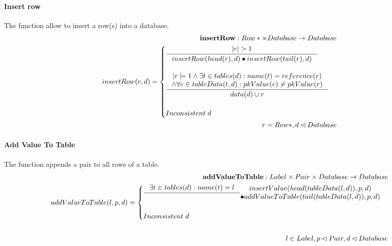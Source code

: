 \documentclass[11pt]{article}
\begin{document}
\paragraph{Insert row} The function allow to insert a row(s) into a database.
\begin{align*}
	\mathbf{insertRow} : Row* \times Database \rightarrow Database \\
	insertRow(r, d) = \begin{cases}
			\inference{|r|>1}{insertRow(head(r), d) \bullet insertRow(tail(r), d)} \\ \\
		 	\inference{|r|=1 \wedge \exists t \in tables(d) : name(t) = reference(r) \\ \wedge \forall e \in tableData(t, d) : pkValue(e) \neq pkValue(r)}{data(d) \cup r} \\ \\
			 Inconsistent \; d
		 \end{cases}	\\
		 r = Row*,d \lhd Database
\end{align*}
\paragraph{Add Value To Table} The function appends a pair to all rows of a table.
\begin{align*}
	\mathbf{addValueToTable} : Label \times Pair \times Database \rightarrow Database \\
	addValueToTable(l, p, d) = \begin{cases}
 		\inference{\exists t \in tables(d) : name(t) = l}	{\begin{gathered}
		insertValue(head(tableData(l, d)), p, d) \\ \bullet addValueToTable(tail(tableData(l, d)), p, d)
	\end{gathered}} \\ \\
 		Inconsistent \; d
 	\end{cases}\\ \\
 	l \in Label, p \lhd Pair,  d \lhd Database
\end{align*}
\end{document}
